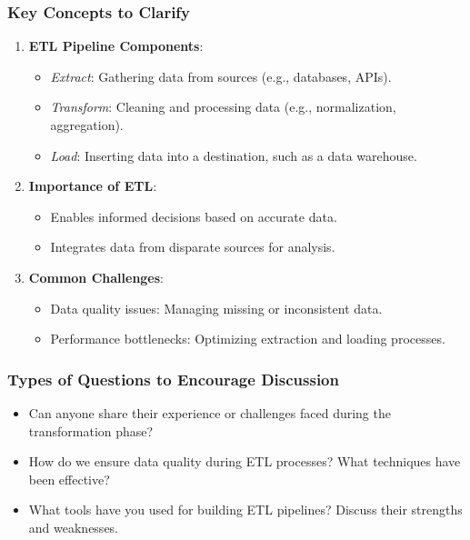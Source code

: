 \documentclass[aspectratio=169]{beamer}
\begin{document}
\begin{frame}[fragile]
    \frametitle{Key Concepts to Clarify}
    \begin{enumerate}
        \item \textbf{ETL Pipeline Components}:
        \begin{itemize}
            \item \textit{Extract}: Gathering data from sources (e.g., databases, APIs).
            \item \textit{Transform}: Cleaning and processing data (e.g., normalization, aggregation).
            \item \textit{Load}: Inserting data into a destination, such as a data warehouse.
        \end{itemize}
        
        \item \textbf{Importance of ETL}:
        \begin{itemize}
            \item Enables informed decisions based on accurate data.
            \item Integrates data from disparate sources for analysis.
        \end{itemize}

        \item \textbf{Common Challenges}:
        \begin{itemize}
            \item Data quality issues: Managing missing or inconsistent data.
            \item Performance bottlenecks: Optimizing extraction and loading processes.
        \end{itemize}
    \end{enumerate}
\end{frame}

\begin{frame}[fragile]
    \frametitle{Types of Questions to Encourage Discussion}
    \begin{itemize}
        \item Can anyone share their experience or challenges faced during the transformation phase?
        \item How do we ensure data quality during ETL processes? What techniques have been effective?
        \item What tools have you used for building ETL pipelines? Discuss their strengths and weaknesses.
    \end{itemize}
\end{frame}
\end{document}
